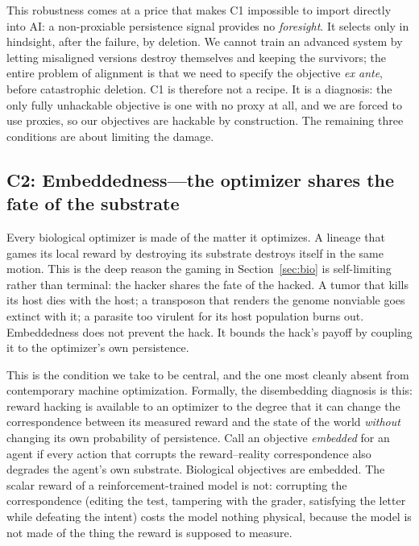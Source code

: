 \documentclass[11pt]{article}
\begin{document}
This robustness comes at a price that makes C1 impossible to import directly into AI: a non-proxiable persistence signal provides no \emph{foresight}. It selects only in hindsight, after the failure, by deletion. We cannot train an advanced system by letting misaligned versions destroy themselves and keeping the survivors; the entire problem of alignment is that we need to specify the objective \emph{ex ante}, before catastrophic deletion. C1 is therefore not a recipe. It is a diagnosis: the only fully unhackable objective is one with no proxy at all, and we are forced to use proxies, so our objectives are hackable by construction. The remaining three conditions are about limiting the damage.

\subsection{C2: Embeddedness---the optimizer shares the fate of the substrate}
Every biological optimizer is made of the matter it optimizes. A lineage that games its local reward by destroying its substrate destroys itself in the same motion. This is the deep reason the gaming in Section~\ref{sec:bio} is self-limiting rather than terminal: the hacker shares the fate of the hacked. A tumor that kills its host dies with the host; a transposon that renders the genome nonviable goes extinct with it; a parasite too virulent for its host population burns out. Embeddedness does not prevent the hack. It bounds the hack's payoff by coupling it to the optimizer's own persistence.

This is the condition we take to be central, and the one most cleanly absent from contemporary machine optimization. Formally, the disembedding diagnosis is this: reward hacking is available to an optimizer to the degree that it can change the correspondence between its measured reward and the state of the world \emph{without} changing its own probability of persistence. Call an objective \emph{embedded} for an agent if every action that corrupts the reward--reality correspondence also degrades the agent's own substrate. Biological objectives are embedded. The scalar reward of a reinforcement-trained model is not: corrupting the correspondence (editing the test, tampering with the grader, satisfying the letter while defeating the intent) costs the model nothing physical, because the model is not made of the thing the reward is supposed to measure.
\end{document}
